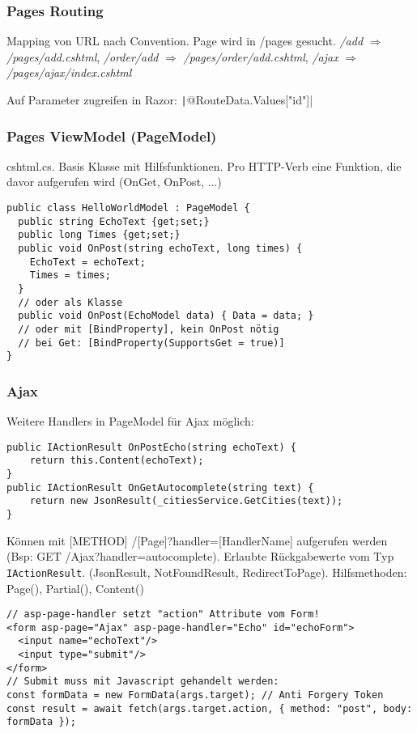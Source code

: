 \begin{multicols*}{2}
\subsubsection{Pages Routing}
Mapping von URL nach Convention. Page wird in /pages gesucht.
\textit{/add} \(\Rightarrow\) \textit{/pages/add.cshtml}, \textit{/order/add} \(\Rightarrow\) \textit{/pages/order/add.cshtml}, \textit{/ajax} \(\Rightarrow\) \textit{/pages/ajax/index.cshtml}

Auf Parameter zugreifen in Razor: \texttt|@RouteData.Values["id"]|

\subsubsection{Pages ViewModel (PageModel)}
cshtml.cs. Basis Klasse mit Hilfsfunktionen. Pro HTTP-Verb eine Funktion, die davor aufgerufen wird (OnGet, OnPost, ...)

\begin{verbatim}
public class HelloWorldModel : PageModel {
  public string EchoText {get;set;}
  public long Times {get;set;}
  public void OnPost(string echoText, long times) {
    EchoText = echoText;
    Times = times;
  }
  // oder als Klasse
  public void OnPost(EchoModel data) { Data = data; }
  // oder mit [BindProperty], kein OnPost nötig
  // bei Get: [BindProperty(SupportsGet = true)]
}
\end{verbatim}

\subsubsection{Ajax}

Weitere Handlers in PageModel für Ajax möglich:
\begin{verbatim}
public IActionResult OnPostEcho(string echoText) {
    return this.Content(echoText);
}
public IActionResult OnGetAutocomplete(string text) {
    return new JsonResult(_citiesService.GetCities(text));
}
\end{verbatim}
Können mit [METHOD] /[Page]?handler=[HandlerName] aufgerufen werden (Bsp: GET /Ajax?handler=autocomplete).
Erlaubte Rückgabewerte vom Typ \lstinline|IActionResult|. (JsonResult, NotFoundResult, RedirectToPage). Hilfsmethoden: Page(), Partial(), Content()



\begin{verbatim}
// asp-page-handler setzt "action" Attribute vom Form!
<form asp-page="Ajax" asp-page-handler="Echo" id="echoForm">
  <input name="echoText"/>
  <input type="submit"/>
</form>
// Submit muss mit Javascript gehandelt werden:
const formData = new FormData(args.target); // Anti Forgery Token
const result = await fetch(args.target.action, { method: "post", body: formData });


\end{verbatim}
\end{multicols*}
